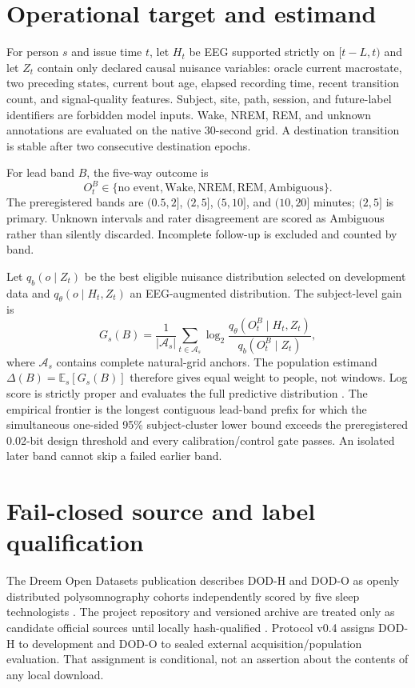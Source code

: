 \documentclass{article}
\newcommand{\E}{\mathbb{E}}
\begin{document}
\section{Operational target and estimand}

For person $s$ and issue time $t$, let $H_t$ be EEG supported strictly on $[t-L,t)$ and let $Z_t$ contain only declared causal nuisance variables: oracle current macrostate, two preceding states, current bout age, elapsed recording time, recent transition count, and signal-quality features. Subject, site, path, session, and future-label identifiers are forbidden model inputs. Wake, NREM, REM, and unknown annotations are evaluated on the native 30-second grid. A destination transition is stable after two consecutive destination epochs.

For lead band $B$, the five-way outcome is
\[
O_t^B\in\{\text{no event},\text{Wake},\text{NREM},\text{REM},\text{Ambiguous}\}.
\]
The preregistered bands are $(0.5,2]$, $(2,5]$, $(5,10]$, and $(10,20]$ minutes; $(2,5]$ is primary. Unknown intervals and rater disagreement are scored as Ambiguous rather than silently discarded. Incomplete follow-up is excluded and counted by band.

Let $q_b(o\mid Z_t)$ be the best eligible nuisance distribution selected on development data and $q_\theta(o\mid H_t,Z_t)$ an EEG-augmented distribution. The subject-level gain is
\begin{equation}
G_s(B)=\frac{1}{|\mathcal A_s|}\sum_{t\in\mathcal A_s}
\log_2\frac{q_\theta(O_t^B\mid H_t,Z_t)}{q_b(O_t^B\mid Z_t)},
\label{eq:gain}
\end{equation}
where $\mathcal A_s$ contains complete natural-grid anchors. The population estimand $\Delta(B)=\E_s[G_s(B)]$ therefore gives equal weight to people, not windows. Log score is strictly proper and evaluates the full predictive distribution \citep{gneiting2007proper}. The empirical frontier is the longest contiguous lead-band prefix for which the simultaneous one-sided 95\% subject-cluster lower bound exceeds the preregistered 0.02-bit design threshold and every calibration/control gate passes. An isolated later band cannot skip a failed earlier band.

\section{Fail-closed source and label qualification}

The Dreem Open Datasets publication describes DOD-H and DOD-O as openly distributed polysomnography cohorts independently scored by five sleep technologists \citep{guillot2020dreem}. The project repository and versioned archive are treated only as candidate official sources until locally hash-qualified \citep{dreemrepo,dodzenodo}. Protocol v0.4 assigns DOD-H to development and DOD-O to sealed external acquisition/population evaluation. That assignment is conditional, not an assertion about the contents of any local download.
\end{document}
